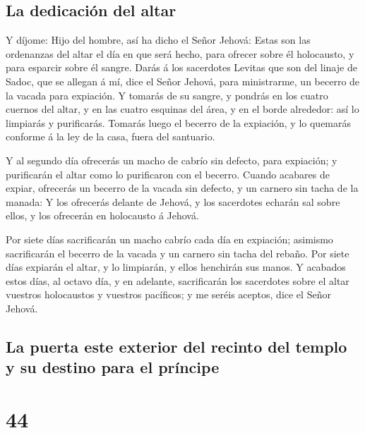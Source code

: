 \hypertarget{la-dedicaciuxf3n-del-altar}{%
\subsection{La dedicación del altar}\label{la-dedicaciuxf3n-del-altar}}

 Y díjome: Hijo del hombre, así ha dicho el Señor Jehová:
Estas son las ordenanzas del altar el día en que será hecho, para
ofrecer sobre él holocausto, y para esparcir sobre él sangre.
 Darás á los sacerdotes Levitas que son del linaje de
Sadoc, que se allegan á mí, dice el Señor Jehová, para ministrarme, un
becerro de la vacada para expiación.  Y tomarás de su
sangre, y pondrás en los cuatro cuernos del altar, y en las cuatro
esquinas del área, y en el borde alrededor: así lo limpiarás y
purificarás.  Tomarás luego el becerro de la expiación, y
lo quemarás conforme á la ley de la casa, fuera del santuario.

 Y al segundo día ofrecerás un macho de cabrío sin defecto,
para expiación; y purificarán el altar como lo purificaron con el
becerro.  Cuando acabares de expiar, ofrecerás un becerro
de la vacada sin defecto, y un carnero sin tacha de la manada:
 Y los ofrecerás delante de Jehová, y los sacerdotes
echarán sal sobre ellos, y los ofrecerán en holocausto á Jehová.

 Por siete días sacrificarán un macho cabrío cada día en
expiación; asimismo sacrificarán el becerro de la vacada y un carnero
sin tacha del rebaño.  Por siete días expiarán el altar, y
lo limpiarán, y ellos henchirán sus manos.  Y acabados
estos días, al octavo día, y en adelante, sacrificarán los sacerdotes
sobre el altar vuestros holocaustos y vuestros pacíficos; y me seréis
aceptos, dice el Señor Jehová.

\hypertarget{la-puerta-este-exterior-del-recinto-del-templo-y-su-destino-para-el-pruxedncipe}{%
\subsection{La puerta este exterior del recinto del templo y su destino
para el
príncipe}\label{la-puerta-este-exterior-del-recinto-del-templo-y-su-destino-para-el-pruxedncipe}}

\hypertarget{section-43}{%
\section{44}\label{section-43}}


